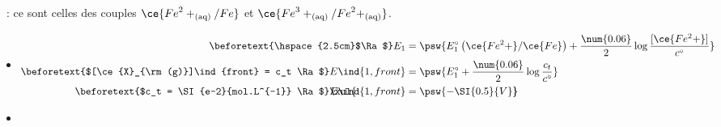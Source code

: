 \documentclass[../../main/main.tex]{subfiles}
\begin{document}
\begin{tcb*}[breakable]
\begin{minipage}[c]{.30\linewidth}
\begin{center}
{			}
		\end{center}
	\end{minipage}
	\tcblower
	\begin{enumerate}[label=\sqenumi]
		~: ce sont celles des couples
		$\ce{{Fe}^2+_{\rm(aq)}/Fe}$ et $\ce{{Fe}^3+_{\rm(aq)}/{Fe}^2+_{\rm(aq)}}$.
		\begin{itemize}
			\item
			      \vspace{-15pt}
			      \begin{align*}
				      \beforetext{\hspace{2.5cm}$\Ra$}
				      E_1
				                     & =
				      \psw{%
					      E_1^\circ \left( \ce{Fe^2+}/\ce{Fe} \right) +
					      \frac{\num{0.06}}{2} \log \frac{[\ce{Fe^2+}]}{c^\circ}
				      }%
				      \\
				      \beforetext{$[\ce{X}_{\rm(g)}]\ind{front} = c_t \Ra $}
				      E\ind{1,front} & =
				      \psw{E_1^\circ + \frac{\num{0.06}}{2}\log \frac{c_t}{c^\circ}}
				      \\
				      \beforetext{$c_t = \SI{e-2}{mol.L^{-1}} \Ra$}
				      \makebox[0pt][l]{$\xul{\phantom{E\ind{1,front} = - \SI{0.5}{V}}}$}
				      E\ind{1,front} & =
				      \psw{- \SI{0.5}{V}}
			      \end{align*}
			      \vspace{-15pt}
			\item
			      \vspace{-15pt}
		\end{itemize}

\end{enumerate}
\end{tcb*}
\end{document}
